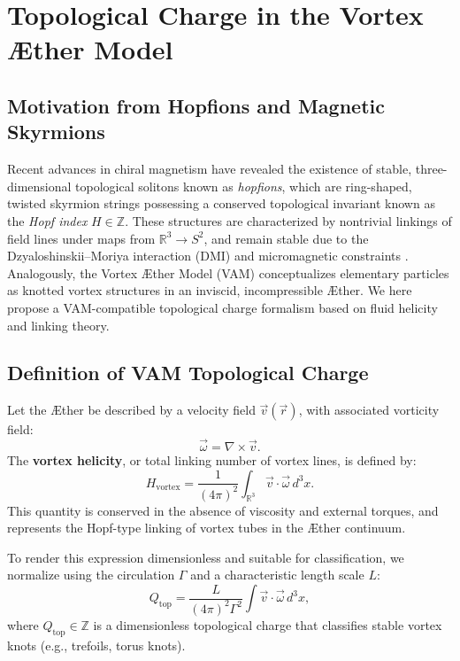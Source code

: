 
\section{Topological Charge in the Vortex Æther Model}

\subsection{Motivation from Hopfions and Magnetic Skyrmions}

Recent advances in chiral magnetism have revealed the existence of stable, three-dimensional topological solitons known as \emph{hopfions}, which are ring-shaped, twisted skyrmion strings possessing a conserved topological invariant known as the \emph{Hopf index} $H \in \mathbb{Z}$. These structures are characterized by nontrivial linkings of field lines under maps from $\mathbb{R}^3 \to S^2$, and remain stable due to the Dzyaloshinskii–Moriya interaction (DMI) and micromagnetic constraints \cite{Zheng2023Hopfions}. Analogously, the Vortex Æther Model (VAM) conceptualizes elementary particles as knotted vortex structures in an inviscid, incompressible Æther. We here propose a VAM-compatible topological charge formalism based on fluid helicity and linking theory.

\subsection{Definition of VAM Topological Charge}

Let the Æther be described by a velocity field $\vec{v}(\vec{r})$, with associated vorticity field:
\begin{equation}
    \vec{\omega} = \nabla \times \vec{v}.
\end{equation}
The \textbf{vortex helicity}, or total linking number of vortex lines, is defined by:
\begin{equation}
    H_{\text{vortex}} = \frac{1}{(4\pi)^2} \int_{\mathbb{R}^3} \vec{v} \cdot \vec{\omega} \, d^3x.
    \label{eq:helicity}
\end{equation}
This quantity is conserved in the absence of viscosity and external torques, and represents the Hopf-type linking of vortex tubes in the Æther continuum.

To render this expression dimensionless and suitable for classification, we normalize using the circulation $\Gamma$ and a characteristic length scale $L$:
\begin{equation}
    Q_{\text{top}} = \frac{L}{(4\pi)^2 \Gamma^2} \int \vec{v} \cdot \vec{\omega} \, d^3x,
    \label{eq:qtop}
\end{equation}
where $Q_{\text{top}} \in \mathbb{Z}$ is a dimensionless topological charge that classifies stable vortex knots (e.g., trefoils, torus knots).

